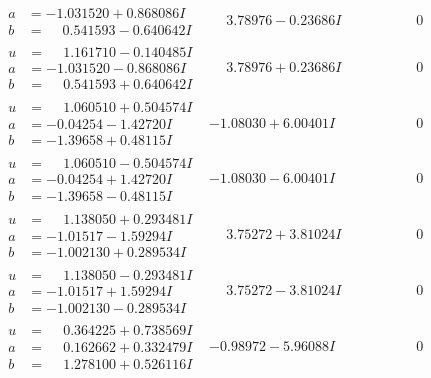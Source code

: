 \documentclass[1p]{elsarticle_modified}
\theoremstyle{definition}
\begin{document}
$$\begin{array}{c|c|c}
\begin{aligned}
a &= -1.031520 + 0.868086 I \\
b &= \phantom{-}0.541593 - 0.640642 I\end{aligned}
 & \phantom{-}3.78976 - 0.23686 I & \phantom{-0.000000 } 0 \\ \hline\begin{aligned}
u &= \phantom{-}1.161710 - 0.140485 I \\
a &= -1.031520 - 0.868086 I \\
b &= \phantom{-}0.541593 + 0.640642 I\end{aligned}
 & \phantom{-}3.78976 + 0.23686 I & \phantom{-0.000000 } 0 \\ \hline\begin{aligned}
u &= \phantom{-}1.060510 + 0.504574 I \\
a &= -0.04254 - 1.42720 I \\
b &= -1.39658 + 0.48115 I\end{aligned}
 & -1.08030 + 6.00401 I & \phantom{-0.000000 } 0 \\ \hline\begin{aligned}
u &= \phantom{-}1.060510 - 0.504574 I \\
a &= -0.04254 + 1.42720 I \\
b &= -1.39658 - 0.48115 I\end{aligned}
 & -1.08030 - 6.00401 I & \phantom{-0.000000 } 0 \\ \hline\begin{aligned}
u &= \phantom{-}1.138050 + 0.293481 I \\
a &= -1.01517 - 1.59294 I \\
b &= -1.002130 + 0.289534 I\end{aligned}
 & \phantom{-}3.75272 + 3.81024 I & \phantom{-0.000000 } 0 \\ \hline\begin{aligned}
u &= \phantom{-}1.138050 - 0.293481 I \\
a &= -1.01517 + 1.59294 I \\
b &= -1.002130 - 0.289534 I\end{aligned}
 & \phantom{-}3.75272 - 3.81024 I & \phantom{-0.000000 } 0 \\ \hline\begin{aligned}
u &= \phantom{-}0.364225 + 0.738569 I \\
a &= \phantom{-}0.162662 + 0.332479 I \\
b &= \phantom{-}1.278100 + 0.526116 I\end{aligned}
 & -0.98972 - 5.96088 I & \phantom{-0.000000 } 0 \\ \hline\begin{aligned}

\end{aligned}
\end{array}$$
\end{document}
